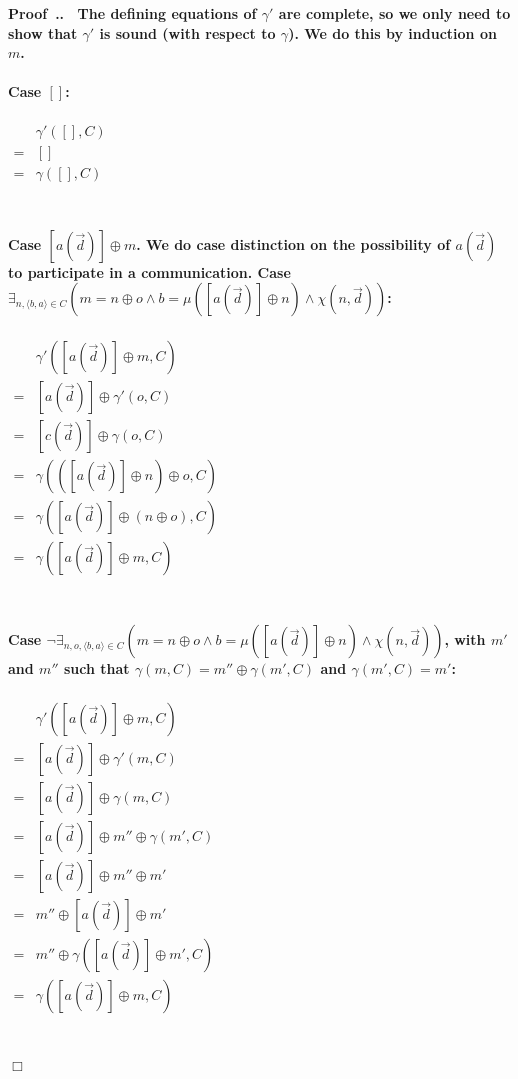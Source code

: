 \documentclass[a4paper,twoside]{article}
\def\vec#1{\overrightarrow{#1}}		%
\def\mset#1{[#1]}
\newcounter{theoremcnt}[section]
\renewcommand{\thetheoremcnt}{\thesection.\arabic{theoremcnt}}
\newenvironment{Proof}%
{\begin{trivlist}\item[]\bf Proof~\thetheoremcnt.~\rm}{\hfill$\Box$\end{trivlist}}
\begin{document}
\begin{Proof}
The defining equations of $\gamma'$ are complete, so we only need to show that $\gamma'$ is sound (with respect to $\gamma$). We do this by induction on $m$.
\\\\
Case $[]$:
\\\\
$\begin{array}{ll}
& \gamma'(\mset{},C) \\
= & \mset{} \\
= & \gamma(\mset{},C) \\
\end{array}$
\\\\\\
Case $\mset{a(\vec{d})}\oplus m$. We do case distinction on the possibility of $a(\vec{d})$ to participate in a communication. Case $\exists_{n,\langle b,a\rangle\in C}(m=n\oplus o\land b=\mu(\mset{a(\vec{d})}\oplus n)\land \chi(n,\vec{d}))$:
\\\\
$\begin{array}{ll}
& \gamma'(\mset{a(\vec{d})}\oplus m,C) \\
= & \mset{a(\vec{d})}\oplus\gamma'(o,C) \\
= & \mset{c(\vec{d})}\oplus\gamma(o,C) \\
= & \gamma((\mset{a(\vec{d})}\oplus n)\oplus o,C) \\
= & \gamma(\mset{a(\vec{d})}\oplus (n\oplus o),C) \\
= & \gamma(\mset{a(\vec{d})}\oplus m,C) \\
\end{array}$
\\\\\\
Case $\neg\exists_{n,o,\langle b,a\rangle\in C}(m=n\oplus o\land b=\mu(\mset{a(\vec{d})}\oplus n)\land \chi(n,\vec{d}))$, with $m'$ and $m''$ such that $\gamma(m,C)=m''\oplus\gamma(m',C)$ and $\gamma(m',C)=m'$:
\\\\
$\begin{array}{ll}
& \gamma'(\mset{a(\vec{d})}\oplus m,C) \\
= & \mset{a(\vec{d})}\oplus\gamma'(m,C) \\
= & \mset{a(\vec{d})}\oplus\gamma(m,C) \\
= & \mset{a(\vec{d})}\oplus m''\oplus\gamma(m',C) \\
= & \mset{a(\vec{d})}\oplus m''\oplus m' \\
= & m''\oplus \mset{a(\vec{d})}\oplus m' \\
= & m''\oplus \gamma(\mset{a(\vec{d})}\oplus m',C) \\
= & \gamma(\mset{a(\vec{d})}\oplus m,C) \\
\end{array}$
\\\\\\
\end{Proof}
\end{document}
